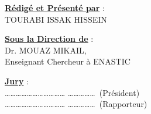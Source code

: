 \begin{titlepage}
	\vspace{1.4cm}
	
	\noindent
	\begin{minipage}[t]{0.46\textwidth}
		\underline{\textbf{Rédigé et Présenté par}} :\\[10pt]
		TOURABI ISSAK HISSEIN
	\end{minipage}
	\hfill
	\begin{minipage}[t]{0.50\textwidth}
		\underline{\textbf{Sous la Direction de}} :\\[10pt]
		Dr. MOUAZ MIKAIL,\\
		Enseignant Chercheur à ENASTIC
	\end{minipage}
	
	\vspace{1.6cm}
	
	\begin{center}
		\underline{\textbf{Jury}} :\\[8pt]
		\ldots\ldots\ldots\ldots\ldots\ldots\ldots\ldots\ldots\ldots\ldots
		\ldots\ldots\ldots\ldots\ldots\ (Président)\\[6pt]
		\ldots\ldots\ldots\ldots\ldots\ldots\ldots\ldots\ldots\ldots\ldots
		\ldots\ldots\ldots\ldots\ldots\ (Rapporteur)
	\end{center}
	
	\vfill
	
	\begin{center}
	\end{center}
	
\end{titlepage}